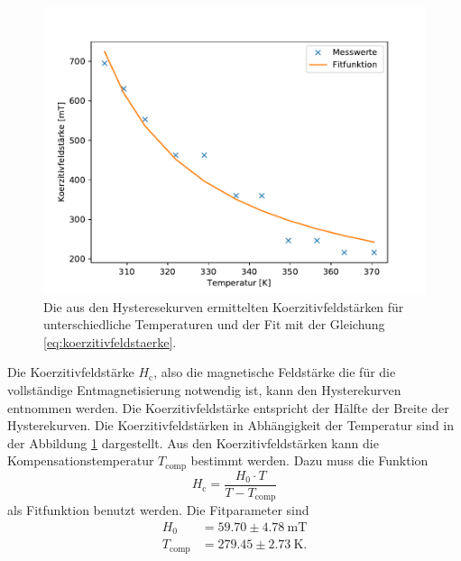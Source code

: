 \begin{figure}[H]
\centering
\includegraphics[scale=0.8]{../Messdaten/auswertung/Kompensationstemperatur.pdf}
\caption{Die aus den Hysteresekurven ermittelten Koerzitivfeldstärken für unterschiedliche Temperaturen 
und der Fit mit der Gleichung \eqref{eq:koerzitivfeldstaerke}.}
\label{fig:koerzitivfeldstaerke}
\end{figure}

Die Koerzitivfeldstärke $H_\mathrm{c}$, also die magnetische Feldstärke die für die vollständige Entmagnetisierung notwendig ist, kann den Hysterekurven entnommen werden. 
Die Koerzitivfeldstärke entspricht der Hälfte der Breite der Hysterekurven. 
Die Koerzitivfeldstärken in Abhängigkeit der Temperatur sind in der Abbildung \ref{fig:koerzitivfeldstaerke} dargestellt. 
Aus den Koerzitivfeldstärken kann die Kompensationstemperatur $T_\mathrm{comp}$ bestimmt  
werden.
Dazu muss die Funktion  
\begin{equation}
H_\mathrm{c} = \frac{H_0 \cdot T}{T-T_\mathrm{comp}}
\label{eq:koerzitivfeldstaerke} 
\end{equation}
als Fitfunktion benutzt werden.
Die Fitparameter sind
\begin{align}
H_0 & = 59.70 \pm 4.78\ \mathrm{mT}\\
T_\mathrm{comp} & = 279.45 \pm 2.73\ \mathrm{K} .
\label{eq:fitwerte}
\end{align}

 
